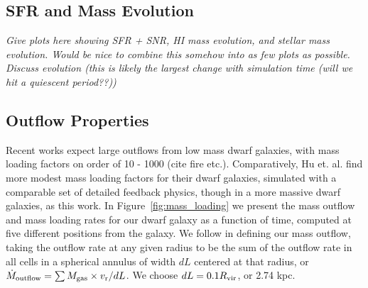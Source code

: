 \documentclass[twocolumn]{aastex61}
\begin{document}
\subsection{SFR and Mass Evolution}
\label{sec:sfr}

\textit{ Give plots here showing SFR + SNR, HI mass evolution, and stellar mass evolution. Would be nice to combine this somehow into as few plots as possible. Discuss evolution (this is likely the largest change with simulation time (will we hit a quiescent period??))}


\subsection{Outflow Properties}
\label{sec:outflows}

Recent works expect large outflows from low mass dwarf galaxies, with mass loading factors on order of 10 - 1000 (cite fire etc.). Comparatively, Hu et. al. find more modest mass loading factors for their dwarf galaxies, simulated with a comparable set of detailed feedback physics, though in a more massive dwarf galaxies, as this work. In Figure~\ref{fig:mass_loading} we present the mass outflow and mass loading rates for our dwarf galaxy as a function of time, computed at five different positions from the galaxy. We follow \cite{Muratov2015} in defining our mass outflow, taking the outflow rate at any given radius to be the sum of the outflow rate in all cells in a spherical annulus of width $dL$ centered at that radius, or $\dot{M}_{\rm outflow} = \sum M_{\rm gas} \times v_{\rm r} / dL$. We choose $dL = 0.1 R_{\rm vir}$, or 2.74 kpc. 
\end{document}
